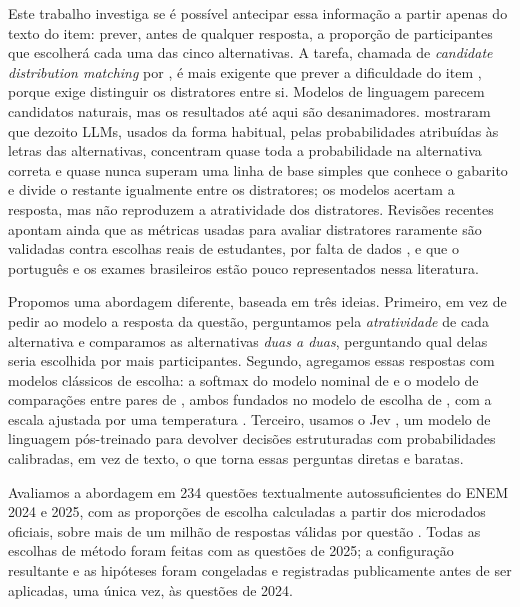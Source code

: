 Este trabalho investiga se é possível antecipar essa informação a partir apenas do texto do item: prever, antes de qualquer resposta, a proporção de participantes que escolherá cada uma das cinco alternativas. A tarefa, chamada de \textit{candidate distribution matching} por \citet{liusie2023}, é mais exigente que prever a dificuldade do item \citep{marinho2023,xue2020}, porque exige distinguir os distratores entre si. Modelos de linguagem parecem candidatos naturais, mas os resultados até aqui são desanimadores. \citet{saeuberli2025} mostraram que dezoito LLMs, usados da forma habitual, pelas probabilidades atribuídas às letras das alternativas, concentram quase toda a probabilidade na alternativa correta e quase nunca superam uma linha de base simples que conhece o gabarito e divide o restante igualmente entre os distratores; os modelos acertam a resposta, mas não reproduzem a atratividade dos distratores. Revisões recentes apontam ainda que as métricas usadas para avaliar distratores raramente são validadas contra escolhas reais de estudantes, por falta de dados \citep{benedetto2025}, e que o português e os exames brasileiros estão pouco representados nessa literatura.

Propomos uma abordagem diferente, baseada em três ideias. Primeiro, em vez de pedir ao modelo a resposta da questão, perguntamos pela \emph{atratividade} de cada alternativa e comparamos as alternativas \emph{duas a duas}, perguntando qual delas seria escolhida por mais participantes. Segundo, agregamos essas respostas com modelos clássicos de escolha: a softmax do modelo nominal de \citet{bock1972} e o modelo de comparações entre pares de \citet{bradley1952}, ambos fundados no modelo de escolha de \citet{luce1959}, com a escala ajustada por uma temperatura \citep{guo2017}. Terceiro, usamos o Jev \citep{typesafe2026docs}, um modelo de linguagem pós-treinado para devolver decisões estruturadas com probabilidades calibradas, em vez de texto, o que torna essas perguntas diretas e baratas.

Avaliamos a abordagem em 234 questões textualmente autossuficientes do ENEM 2024 e 2025, com as proporções de escolha calculadas a partir dos microdados oficiais, sobre mais de um milhão de respostas válidas por questão \citep{inep2025microdados2024,inep2026microdados2025}. Todas as escolhas de método foram feitas com as questões de 2025; a configuração resultante e as hipóteses foram congeladas e registradas publicamente antes de ser aplicadas, uma única vez, às questões de 2024.

